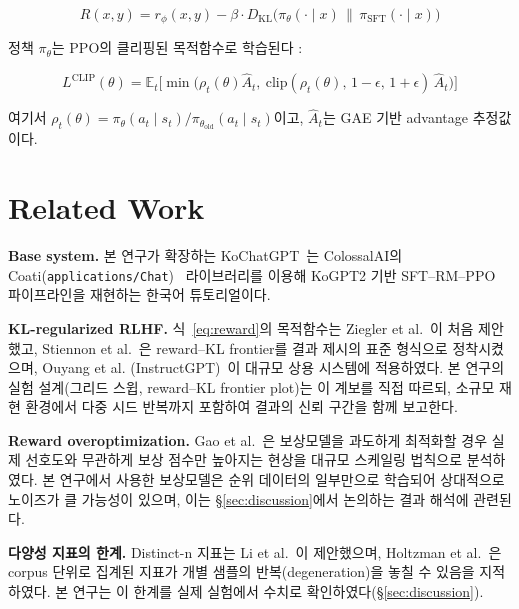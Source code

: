 \documentclass[conference]{IEEEtran}
\begin{document}
\begin{equation}
R(x, y) = r_\phi(x, y) - \beta \cdot D_{\mathrm{KL}}\big(\pi_\theta(\cdot \mid x)
\,\|\, \pi_{\text{SFT}}(\cdot \mid x)\big)
\label{eq:reward}
\end{equation}

정책 $\pi_\theta$는 PPO의 클리핑된 목적함수로 학습된다
\cite{schulman2017ppo}:

\begin{equation}
L^{\mathrm{CLIP}}(\theta) = \mathbb{E}_t\Big[\min\big(\rho_t(\theta)
\hat{A}_t,\ \mathrm{clip}(\rho_t(\theta),\, 1-\epsilon,\, 1+\epsilon)\,
\hat{A}_t\big)\Big]
\label{eq:ppo}
\end{equation}

여기서 $\rho_t(\theta) = \pi_\theta(a_t \mid s_t) / \pi_{\theta_{\text{old}}}(a_t
\mid s_t)$이고, $\hat{A}_t$는 GAE 기반 advantage 추정값이다.

\section{Related Work}

\textbf{Base system.} 본 연구가 확장하는 KoChatGPT~\cite{kochatgpt2023}는
ColossalAI의 Coati(\texttt{applications/Chat})~\cite{colossalchat2023}
라이브러리를 이용해 KoGPT2 기반 SFT--RM--PPO 파이프라인을 재현하는
한국어 튜토리얼이다.

\textbf{KL-regularized RLHF.} 식~\eqref{eq:reward}의 목적함수는
Ziegler et al.~\cite{ziegler2019finetuning}이 처음 제안했고,
Stiennon et al.~\cite{stiennon2020learning}은 reward--KL frontier를
결과 제시의 표준 형식으로 정착시켰으며, Ouyang et al.
(InstructGPT)~\cite{ouyang2022instructgpt}이 대규모 상용 시스템에
적용하였다. 본 연구의 실험 설계(그리드 스윕, reward--KL frontier plot)는
이 계보를 직접 따르되, 소규모 재현 환경에서 다중 시드 반복까지 포함하여
결과의 신뢰 구간을 함께 보고한다.

\textbf{Reward overoptimization.} Gao et al.~\cite{gao2023scaling}은
보상모델을 과도하게 최적화할 경우 실제 선호도와 무관하게 보상 점수만
높아지는 현상을 대규모 스케일링 법칙으로 분석하였다. 본 연구에서 사용한
보상모델은 순위 데이터의 일부만으로 학습되어 상대적으로 노이즈가 클
가능성이 있으며, 이는 \S\ref{sec:discussion}에서 논의하는 결과 해석에
관련된다.

\textbf{다양성 지표의 한계.} Distinct-n 지표는 Li et
al.~\cite{li2016diversity}이 제안했으며, Holtzman et
al.~\cite{holtzman2020curious}은 corpus 단위로 집계된 지표가 개별 샘플의
반복(degeneration)을 놓칠 수 있음을 지적하였다. 본 연구는 이 한계를
실제 실험에서 수치로 확인하였다(\S\ref{sec:discussion}).
\end{document}
